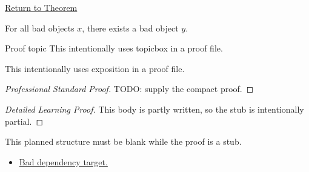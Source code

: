 \newpage
{}
\label{prf:bad-result}

\begin{remark*}[Return]
\hyperref[thm:bad-result]{Return to Theorem}
\end{remark*}

\begin{theorem*}
\label{thm:bad-result-restated}
For all bad objects $x$, there exists a bad object $y$.
\end{theorem*}

\begin{topicbox}{Proof topic}
This intentionally uses topicbox in a proof file.
\end{topicbox}

\begin{exposition}
This intentionally uses exposition in a proof file.
\end{exposition}

\begin{proof}[Professional Standard Proof]
TODO: supply the compact proof.
\end{proof}

\begin{proof}[Detailed Learning Proof]
This body is partly written, so the stub is intentionally partial.
\end{proof}

\begin{remark*}
This planned structure must be blank while the proof is a stub.
\end{remark*}

\begin{dependencies}
\begin{itemize}
  \item \hyperref[prf:other]{Bad dependency target.}
\end{itemize}
\end{dependencies}
\clearpage
